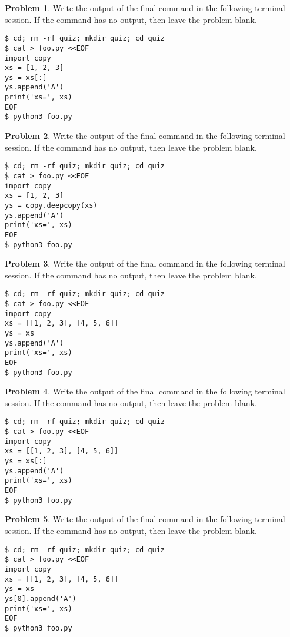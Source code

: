\documentclass[10pt]{article}
\theoremstyle{definition}
\newtheorem{problem}{Problem}
\begin{document}
\filbreak
\begin{problem}
    Write the output of the final command in the following terminal session.
    If the command has no output, then leave the problem blank.
\end{problem}
\begin{lstlisting}
$ cd; rm -rf quiz; mkdir quiz; cd quiz
$ cat > foo.py <<EOF
import copy
xs = [1, 2, 3]
ys = xs[:]
ys.append('A')
print('xs=', xs)
EOF
$ python3 foo.py
\end{lstlisting}


\filbreak
\begin{problem}
    Write the output of the final command in the following terminal session.
    If the command has no output, then leave the problem blank.
\end{problem}
\begin{lstlisting}
$ cd; rm -rf quiz; mkdir quiz; cd quiz
$ cat > foo.py <<EOF
import copy
xs = [1, 2, 3]
ys = copy.deepcopy(xs)
ys.append('A')
print('xs=', xs)
EOF
$ python3 foo.py
\end{lstlisting}


\filbreak
\begin{problem}
    Write the output of the final command in the following terminal session.
    If the command has no output, then leave the problem blank.
\end{problem}
\begin{lstlisting}
$ cd; rm -rf quiz; mkdir quiz; cd quiz
$ cat > foo.py <<EOF
import copy
xs = [[1, 2, 3], [4, 5, 6]]
ys = xs
ys.append('A')
print('xs=', xs)
EOF
$ python3 foo.py
\end{lstlisting}


\filbreak
\begin{problem}
    Write the output of the final command in the following terminal session.
    If the command has no output, then leave the problem blank.
\end{problem}
\begin{lstlisting}
$ cd; rm -rf quiz; mkdir quiz; cd quiz
$ cat > foo.py <<EOF
import copy
xs = [[1, 2, 3], [4, 5, 6]]
ys = xs[:]
ys.append('A')
print('xs=', xs)
EOF
$ python3 foo.py
\end{lstlisting}


\filbreak
\begin{problem}
    Write the output of the final command in the following terminal session.
    If the command has no output, then leave the problem blank.
\end{problem}
\begin{lstlisting}
$ cd; rm -rf quiz; mkdir quiz; cd quiz
$ cat > foo.py <<EOF
import copy
xs = [[1, 2, 3], [4, 5, 6]]
ys = xs
ys[0].append('A')
print('xs=', xs)
EOF
$ python3 foo.py
\end{lstlisting}
\end{document}
